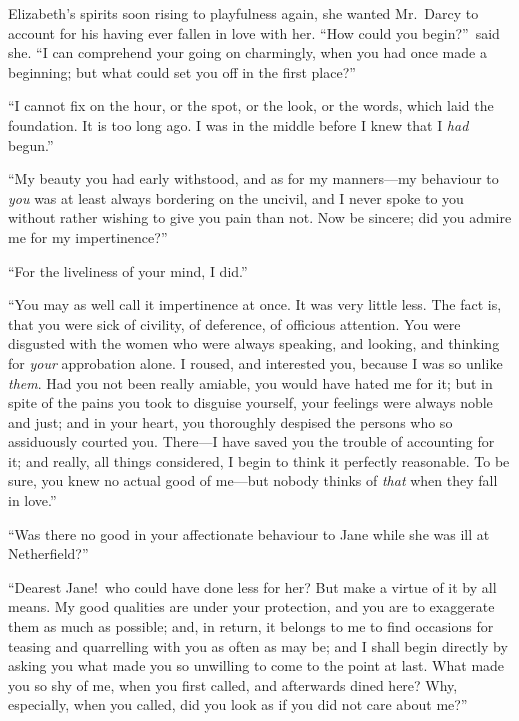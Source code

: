 \documentclass[12pt,english,oneside]{book}
\begin{document}

Elizabeth's spirits soon rising to playfulness again, she wanted Mr.\ Darcy
to account for his having ever fallen in love with her. {}``How could
you begin?''\ said she. {}``I can comprehend your going on charmingly,
when you had once made a beginning; but what could set you off in
the first place?''

{}``I cannot fix on the hour, or the spot, or the look, or the words,
which laid the foundation. It is too long ago. I was in the middle
before I knew that I \textit{had} begun.''

{}``My beauty you had early withstood, and as for my manners\mbox{---}my
behaviour to \textit{you} was at least always bordering on the uncivil,
and I never spoke to you without rather wishing to give you pain than
not. Now be sincere; did you admire me for my impertinence?''

{}``For the liveliness of your mind, I did.''

{}``You may as well call it impertinence at once. It was very little
less. The fact is, that you were sick of civility, of deference, of
officious attention. You were disgusted with the women who were always
speaking, and looking, and thinking for \textit{your} approbation
alone. I roused, and interested you, because I was so unlike \textit{them}.
Had you not been really amiable, you would have hated me for it; but
in spite of the pains you took to disguise yourself, your feelings
were always noble and just; and in your heart, you thoroughly despised
the persons who so assiduously courted you. There\mbox{---}I have
saved you the trouble of accounting for it; and really, all things
considered, I begin to think it perfectly reasonable. To be sure,
you knew no actual good of me\mbox{---}but nobody thinks of \textit{that}
when they fall in love.''

{}``Was there no good in your affectionate behaviour to Jane while
she was ill at Netherfield?''

{}``Dearest Jane!\ who could have done less for her? But make a
virtue of it by all means. My good qualities are under your protection,
and you are to exaggerate them as much as possible; and, in return,
it belongs to me to find occasions for teasing and quarrelling with
you as often as may be; and I shall begin directly by asking you what
made you so unwilling to come to the point at last. What made you
so shy of me, when you first called, and afterwards dined here? Why,
especially, when you called, did you look as if you did not care about
me?''
\end{document}
